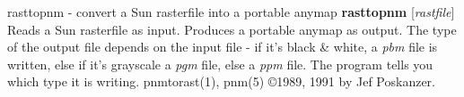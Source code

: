 %

\newpage
%

rasttopnm - convert a Sun rasterfile into a portable anymap
{\bf rasttopnm}
{\rm [}{\it rastfile}{\rm ]}
Reads a Sun rasterfile as input.
Produces a portable anymap as output.
The type of the output file depends on the input file - if it's
black \& white, a
{\it pbm}
file is written, else if it's grayscale a
{\it pgm}
file, else a
{\it ppm}
file.  The program tells you which type it is writing.
pnmtorast(1), pnm(5)
\copyright 1989, 1991 by Jef Poskanzer.
%
 
%

\newpage
%

